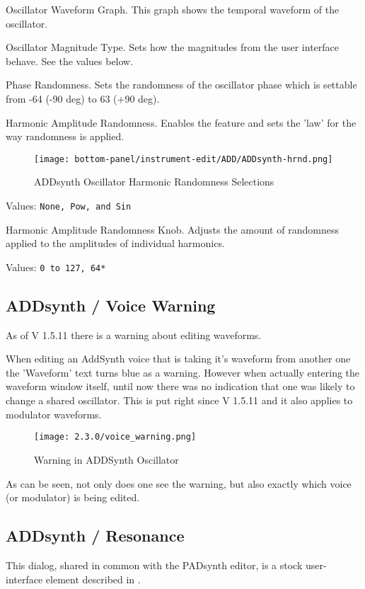    Oscillator Waveform Graph.
   This graph shows the temporal waveform  of the oscillator.

   Oscillator Magnitude Type.
   Sets how the magnitudes from the user interface behave.  See the values
   below.

   Phase Randomness. Sets the randomness of the oscillator phase which is
   settable from -64 (-90 deg) to 63 (+90 deg).

   Harmonic Amplitude Randomness.
   Enables the feature and sets the 'law' for the way randomness is applied.

\begin{figure}[H]
   \centering
   \texttt{[image: bottom-panel/instrument-edit/ADD/ADDsynth-hrnd.png]}
   \caption{ADDsynth Oscillator Harmonic Randomness Selections}
   \label{fig:addsynth_hrnd}
\end{figure}

   Values: \texttt{None, Pow, and Sin}

   Harmonic Amplitude Randomness Knob.
   Adjusts the amount of randomness applied to the amplitudes of individual harmonics.

   Values: \texttt{0 to 127, 64*}

\subsection{ADDsynth / Voice Warning}
\label{subsec:addsynth_voice-warning}
   As of V 1.5.11 there is a warning about editing waveforms.

   When editing an AddSynth voice that is taking it's waveform from another one
   the 'Waveform' text turns blue as a warning. However when actually entering
   the waveform window itself, until now there was no indication that one was
   likely to change a shared oscillator. This is put right since V 1.5.11 and
   it also applies to modulator waveforms.

\begin{figure}[H]
   \centering
   \texttt{[image: 2.3.0/voice\_warning.png]}
   \caption{Warning in ADDSynth Oscillator}
   \label{fig:voice_oscillator_warning}
\end{figure}

   As can be seen, not only does one see the warning, but also exactly which
   voice (or modulator) is being edited.

\subsection{ADDsynth / Resonance}
\label{subsec:addsynth_resonance}

   This dialog, shared in common with the PADsynth editor, is a stock
   user-interface element described in
   .

